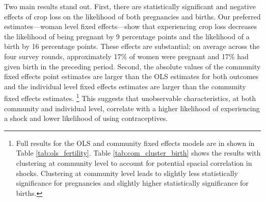 \documentclass[letterpaper,12pt]{article}
\begin{document}



Two main results stand out.
First, there are statistically significant and negative effects of crop loss on the
likelihood of both pregnancies and births.
Our preferred estimates---woman level fixed effects---show that experiencing 
crop loss decreases the likelihood of being pregnant by 9 percentage points 
and the likelihood of a birth by 16 percentage points.
These effects are substantial; on average across the four survey rounds, approximately 
17\% of women were pregnant and 17\% had given birth in the preceding period. 
Second, the absolute values of the community fixed effects point estimates are 
larger than the OLS estimates for both outcomes and the individual level
fixed effects estimates are larger than the community fixed effects estimates.%
\footnote{
Full results for the OLS and community fixed effects models are in shown in 
Table \ref{tab:ols_fertility}.
Table \ref{tab:com_cluster_birth} shows the results with clustering at community level
to account for potential spacial correlation in shocks.
Clustering at community level leads to slightly less statistically significance for 
pregnancies and slightly higher statistically significance for births.
}
This suggests that unobservable characteristics, at both community
and individual level, correlate with a higher likelihood of experiencing 
a shock and lower likelihood of using contraceptives.
\end{document}
